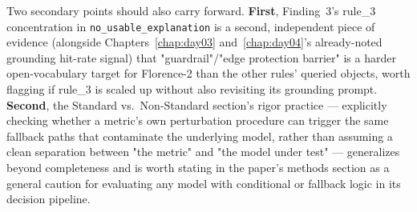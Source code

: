Two secondary points should also carry forward. \textbf{First}, Finding~3's rule\_3 concentration in
\texttt{no\_usable\_explanation} is a second, independent piece of evidence (alongside
Chapters~\ref{chap:day03} and~\ref{chap:day04}'s already-noted grounding hit-rate signal) that
"guardrail"/"edge protection barrier" is a harder open-vocabulary target for Florence-2 than the other
rules' queried objects, worth flagging if rule\_3 is scaled up without also revisiting its grounding
prompt. \textbf{Second}, the Standard vs.\ Non-Standard section's rigor practice --- explicitly checking
whether a metric's own perturbation procedure can trigger the same fallback paths that contaminate the
underlying model, rather than assuming a clean separation between "the metric" and "the model under
test" --- generalizes beyond completeness and is worth stating in the paper's methods section as a
general caution for evaluating any model with conditional or fallback logic in its decision pipeline.
